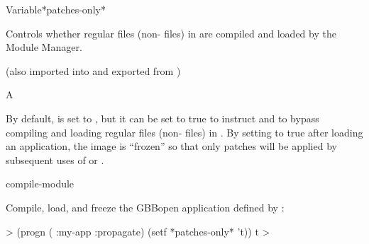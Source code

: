 \documentclass[10pt,twoside,english,pdftex]{article}
\begin{document}
\begin{functiondoc}{Variable}{*patches-only*}{}%
%
% 
%
%

\fnsyntax

\fnpurpose Controls whether regular files (non- files) in
 are compiled and loaded by the Module Manager.

\fnpackage {} 
(also imported into and exported from )

\fnmodule {}

\fnvaluetype A 

\fninitialvalue \nil

\fndescription By default,  is set to \nil, but
it can be set to true to instruct  and
 to bypass compiling and loading regular
files (non- files) in .  By setting
 to true after loading an application, the image
is ``frozen'' so that only patches will be applied by subsequent uses of
 or
.

\begin{alsos}{compile-module}
\end{alsos}

\fnexample
{}
%
Compile, load, and freeze the GBBopen application defined by 
:
%
\W\supp
\begin{example}
  > (progn ( :my-app :propagate)
           (setf *patches-only* 't))
  t
  >
\end{example}

\end{functiondoc}

\end{document}
